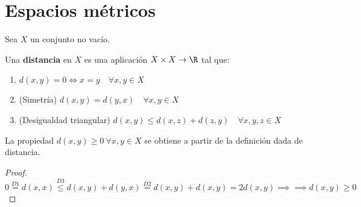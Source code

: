 
\section{Espacios métricos}
Sea $X$ un conjunto no vacío.
\begin{ndef}[Distancia]
  Una \textbf{distancia} en $X$ es una aplicación $X \times X \to \R$ tal que:
  \begin{enumerate}[label=D{{\arabic*}}]
    \item $d(x,y)=0 \Leftrightarrow x=y \quad \forall x,y \in X$
    \item (Simetría) $d(x,y)=d(y,x) \quad \forall x,y \in X$
    \item (Desigualdad triangular) $d(x,y) \le d(x,z)+d(z,y) \quad \forall x,y,z \in X$
  \end{enumerate}
\end{ndef}
\begin{note}
  La propiedad $d(x,y) \geq 0 \ \forall x,y \in X$ se obtiene a partir de la definición dada de distancia.
\end{note}
\begin{proof}
  $0 \stackrel{D1}{=} d(x,x) \stackrel{D3}{\leq} d(x,y)+d(y,x) \stackrel{D2}{=} d(x,y)+d(x,y)=2d(x,y) \implies \implies d(x,y) \geq 0$
\end{proof}

